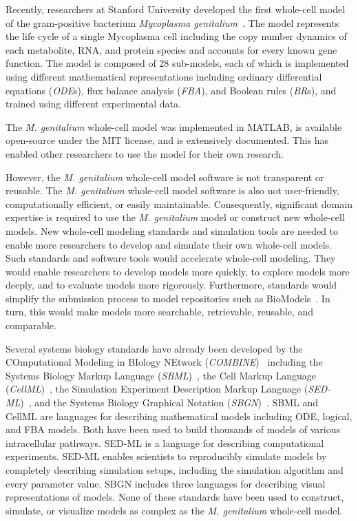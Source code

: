 \documentclass[journal,transmag]{IEEEtran}
\begin{document}
Recently, researchers at Stanford University developed the first whole-cell model of the gram-positive bacterium \textit{Mycoplasma genitalium}~\cite{Karr2012}. The model represents the life cycle of a single Mycoplasma cell including the copy number dynamics of each metabolite, RNA, and protein species and accounts for every known gene function. The model is composed of 28 sub-models, each of which is implemented using different mathematical representations including ordinary differential equations (\emph{ODE}s), flux balance analysis (\emph{FBA}), and Boolean rules (\emph{BR}s), and trained using different experimental data.

The \textit{M. genitalium} whole-cell model was implemented in MATLAB, is available open-source under the MIT license, and is extensively documented. This has enabled other researchers to use the model for their own research. 

However, the \textit{M. genitalium} whole-cell model software is not transparent or reusable. The \textit{M. genitalium} whole-cell model software is also not user-friendly, computationally efficient, or easily maintainable. Consequently, significant domain expertise is required to use the \textit{M. genitalium} model or construct new whole-cell models. New whole-cell modeling standards and simulation tools are needed to enable more researchers to develop and simulate their own whole-cell models. Such standards and software tools would accelerate whole-cell modeling. They would enable researchers to develop models more quickly, to explore models more deeply, and to evaluate models more rigorously. Furthermore, standards would simplify the submission process to model repositories such as BioModels~\cite{juty2015biomodels,chelliah2015biomodels}. In turn, this would make models more searchable, retrievable, reusable, and comparable.

Several systems biology standards have already been developed by the COmputational Modeling in BIology NEtwork (\emph{COMBINE})~\cite{le2011meeting} including the Systems Biology Markup Language (\emph{SBML})~\cite{hucka2003}, the Cell Markup Language (\emph{CellML})~\cite{hedley_2001b}, the Simulation Experiment Description Markup Language (\emph{SED-ML})~\cite{sedml2011}, and the Systems Biology Graphical Notation (\emph{SBGN})~\cite{LeNovereHMMSS09}. SBML and CellML are languages for describing mathematical models including ODE, logical, and FBA models. Both have been used to build thousands of models of various intracellular pathways. SED-ML is a language for describing computational experiments. SED-ML enables scientists to reproducibly simulate models by completely describing simulation setups, including the simulation algorithm and every parameter value. SBGN includes three languages for describing visual representations of models. None of these standards have been used to construct, simulate, or visualize models as complex as the \textit{M. genitalium} whole-cell model.
\end{document}
